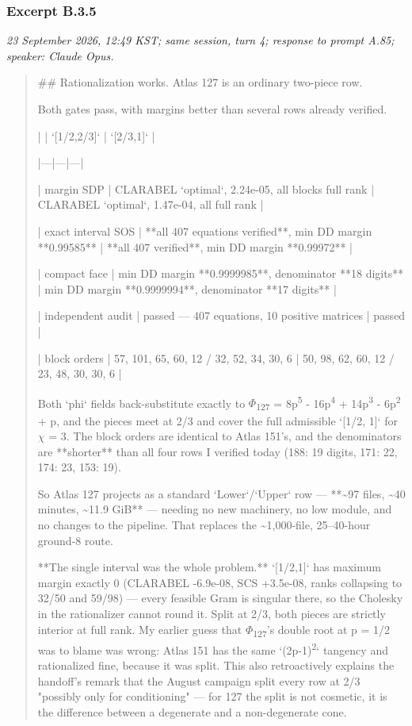 \subsubsection*{Excerpt B.3.5}
\label{ex:B35}
\noindent\textit{23 September 2026, 12:49 KST; same session, turn 4; response to prompt A.85; speaker: Claude Opus.}
\begin{quote}\small\ttfamily\raggedright
\#\# Rationalization works. Atlas 127 is an ordinary two-piece row.
\par
\medskip
Both gates pass, with margins better than several rows already verified.
\par
\medskip
| | `[1/2,2/3]` | `[2/3,1]` |
\par
|---|---|---|
\par
| margin SDP | CLARABEL `optimal`, 2.24e-05, all blocks full rank | CLARABEL `optimal`, 1.47e-04, all full rank |
\par
| exact interval SOS | **all 407 equations verified**, min DD margin **0.99585** | **all 407 verified**, min DD margin **0.99972** |
\par
| compact face | min DD margin **0.9999985**, denominator **18 digits** | min DD margin **0.9999994**, denominator **17 digits** |
\par
| independent audit | passed --- 407 equations, 10 positive matrices | passed |
\par
| block orders | 57, 101, 65, 60, 12 / 32, 52, 34, 30, 6 | 50, 98, 62, 60, 12 / 23, 48, 30, 30, 6 |
\par
\medskip
Both `phi` fields back-substitute exactly to \(\Phi\)\textsubscript{1}\textsubscript{2}\textsubscript{7} = 8p\textsuperscript{5} - 16p\textsuperscript{4} + 14p\textsuperscript{3} - 6p\textsuperscript{2} + p, and the pieces meet at 2/3 and cover the full admissible `[1/2, 1]` for \(\chi\) = 3. The block orders are identical to Atlas 151's, and the denominators are **shorter** than all four rows I verified today (188: 19 digits, 171: 22, 174: 23, 153: 19).
\par
\medskip
So Atlas 127 projects as a standard `Lower`/`Upper` row --- **\textasciitilde{}97 files, \textasciitilde{}40 minutes, \textasciitilde{}11.9 GiB** --- needing no new machinery, no low module, and no changes to the pipeline. That replaces the \textasciitilde{}1,000-file, 25--40-hour ground-8 route.
\par
\medskip
**The single interval was the whole problem.** `[1/2,1]` has maximum margin exactly 0 (CLARABEL -6.9e-08, SCS +3.5e-08, ranks collapsing to 32/50 and 59/98) --- every feasible Gram is singular there, so the Cholesky in the rationalizer cannot round it. Split at 2/3, both pieces are strictly interior at full rank. My earlier guess that \(\Phi\)\textsubscript{1}\textsubscript{2}\textsubscript{7}'s double root at p = 1/2 was to blame was wrong: Atlas 151 has the same `(2p-1)\textsuperscript{2}` tangency and rationalized fine, because it was split. This also retroactively explains the handoff's remark that the August campaign split every row at 2/3 "possibly only for conditioning" --- for 127 the split is not cosmetic, it is the difference between a degenerate and a non-degenerate cone.
\par
\end{quote}

